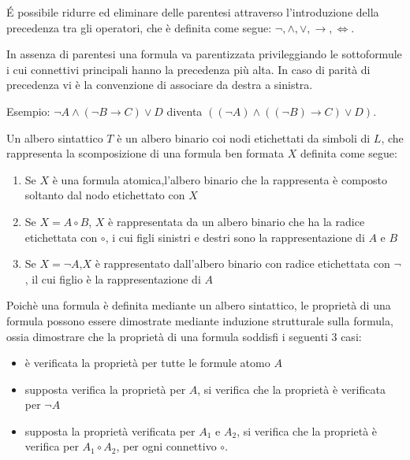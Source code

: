 É possibile ridurre ed eliminare delle parentesi attraverso l'introduzione della
precedenza tra gli operatori, che è definita come segue:\newline
$\neg, \land, \lor, \rightarrow,\iff$.

In assenza di parentesi una formula va parentizzata privileggiando le sottoformule
i cui connettivi principali hanno la precedenza più alta.\newline
In caso di parità di precedenza vi è la convenzione di associare da destra a sinistra.

Esempio:\newline
$\neg A \land (\neg B \rightarrow C) \lor D$ diventa
$((\neg A) \land ((\neg B) \rightarrow C) \lor D)$.

\begin{defi}
    Un albero sintattico $T$ è un albero binario coi nodi etichettati da simboli
di $L$, che rappresenta la scomposizione di una formula ben formata $X$ definita come segue:
\end{defi}
\begin{enumerate}
    \item Se $X$ è una formula atomica,l'albero binario che la rappresenta è composto
          soltanto dal nodo etichettato con $X$
    \item Se $X = A \circ B$, $X$ è rappresentata da un albero binario che ha la radice
          etichettata con $\circ$, i cui figli sinistri e destri sono la rappresentazione di $A$ e $B$
    \item Se $X = \neg A$,$X$ è rappresentato dall'albero binario con radice etichettata
          con $\neg$, il cui figlio è la rappresentazione di $A$
\end{enumerate}

Poichè una formula è definita mediante un albero sintattico, le proprietà di una formula
possono essere dimostrate mediante induzione strutturale sulla formula, ossia dimostrare
che la proprietà di una formula soddisfi i seguenti 3 casi:
\begin{itemize}
  \item è verificata la proprietà per tutte le formule atomo $A$
  \item supposta verifica la proprietà per $A$, si verifica che la proprietà è verificata per $\neg A$
  \item supposta la proprietà verificata per $A_1$ e $A_2$, si verifica che la
        proprietà è verifica per $A_1 \circ A_2$, per ogni connettivo $\circ$.
\end{itemize}


